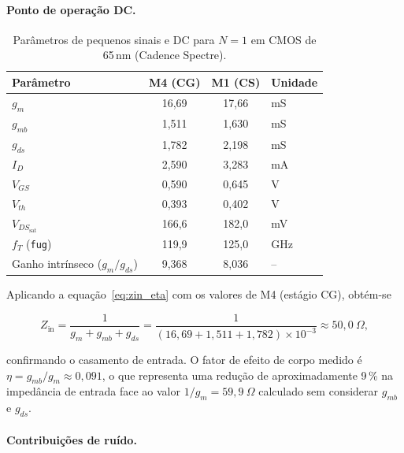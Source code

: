 \paragraph{Ponto de operação DC.}

\begin{table}[H]
\centering
\caption{Parâmetros de pequenos sinais e DC para $N=1$ em CMOS de 65\,nm (Cadence Spectre).}
\label{tab:op65_N1}
\begin{tabular}{lccl}
\hline
\textbf{Parâmetro} & \textbf{M4 (CG)} & \textbf{M1 (CS)} & \textbf{Unidade} \\
\hline
$g_m$                           & 16{,}69 & 17{,}66 & mS \\
$g_{mb}$                        & 1{,}511 & 1{,}630 & mS \\
$g_{ds}$                        & 1{,}782 & 2{,}198 & mS \\
$I_D$                           & 2{,}590 & 3{,}283 & mA \\
$V_{GS}$                        & 0{,}590 & 0{,}645 & V  \\
$V_{th}$                        & 0{,}393 & 0{,}402 & V  \\
$V_{DS_{\text{sat}}}$           & 166{,}6 & 182{,}0 & mV \\
$f_T$ (\texttt{fug})            & 119{,}9 & 125{,}0 & GHz \\
Ganho intrínseco ($g_m/g_{ds}$) & 9{,}368 & 8{,}036 & --  \\
\hline
\end{tabular}
\end{table}

Aplicando a equação~\eqref{eq:zin_eta} com os valores de M4 (estágio CG), obtém-se

\begin{equation*}
    Z_{\text{in}} = \frac{1}{g_m + g_{mb} + g_{ds}}
    = \frac{1}{(16{,}69 + 1{,}511 + 1{,}782) \times 10^{-3}}
    \approx 50{,}0~\Omega,
\end{equation*}

confirmando o casamento de entrada. O fator de efeito de corpo medido é $\eta = g_{mb}/g_m \approx
0{,}091$, o que representa uma redução de aproximadamente 9\,\% na impedância de entrada face ao
valor $1/g_m = 59{,}9~\Omega$ calculado sem considerar $g_{mb}$ e $g_{ds}$.

\paragraph{Contribuições de ruído.}

